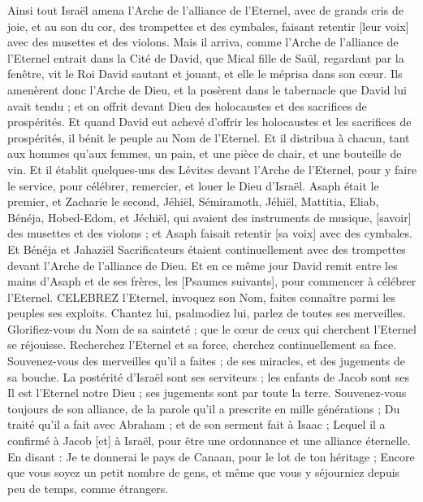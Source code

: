 \begin{multicols}{2}
Ainsi tout Israël amena l'Arche de l'alliance de l'Eternel, avec de grands cris de joie, et au son du cor, des trompettes et des cymbales, faisant retentir [leur voix] avec des musettes et des violons.
Mais il arriva, comme l'Arche de l'alliance de l'Eternel entrait dans la Cité de David, que Mical fille de Saül, regardant par la fenêtre, vit le Roi David sautant et jouant, et elle le méprisa dans son cœur.
\VerseOne{}Ils amenèrent donc l'Arche de Dieu, et la posèrent dans le tabernacle que David lui avait tendu ; et on offrit devant Dieu des holocaustes et des sacrifices de prospérités.
Et quand David eut achevé d'offrir les holocaustes et les sacrifices de prospérités, il bénit le peuple au Nom de l'Eternel.
Et il distribua à chacun, tant aux hommes qu'aux femmes, un pain, et une pièce de chair, et une bouteille de vin.
Et il établit quelques-uns des Lévites devant l'Arche de l'Eternel, pour y faire le service, pour célébrer, remercier, et louer le Dieu d'Israël.
Asaph était le premier, et Zacharie le second, Jéhiël, Sémiramoth, Jéhiël, Mattitia, Eliab, Bénéja, Hobed-Edom, et Jéchiël, qui avaient des instruments de musique, [savoir] des musettes et des violons ; et Asaph faisait retentir [sa voix] avec des cymbales.
Et Bénéja et Jahaziël Sacrificateurs étaient continuellement avec des trompettes devant l'Arche de l'alliance de Dieu.
Et en ce même jour David remit entre les mains d'Asaph et de ses frères, les [Psaumes suivants], pour commencer à célébrer l'Eternel.
CELEBREZ l'Eternel, invoquez son Nom, faites connaître parmi les peuples ses exploits.
Chantez lui, psalmodiez lui, parlez de toutes ses merveilles.
Glorifiez-vous du Nom de sa sainteté ; que le cœur de ceux qui cherchent l'Eternel se réjouisse.
Recherchez l'Eternel et sa force, cherchez continuellement sa face.
Souvenez-vous des merveilles qu'il a faites ; de ses miracles, et des jugements de sa bouche.
La postérité d'Israël sont ses serviteurs ; les enfants de Jacob sont ses
Il est l'Eternel notre Dieu ; ses jugements sont par toute la terre.
Souvenez-vous toujours de son alliance, de la parole qu'il a prescrite en mille générations ;
Du traité qu'il a fait avec Abraham ; et de son serment fait à Isaac ;
Lequel il a confirmé à Jacob [et] à Israël, pour être une ordonnance et une alliance éternelle.
En disant : Je te donnerai le pays de Canaan, pour le lot de ton héritage ;
Encore que vous soyez un petit nombre de gens, et même que vous y séjourniez depuis peu de temps, comme étrangers.

\end{multicols}
